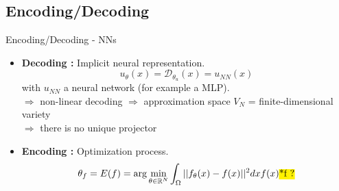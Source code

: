 \subsection{Encoding/Decoding}

\begin{frame}{Encoding/Decoding - NNs}
	\begin{itemize}[\textbullet]
		\item \textbf{Decoding :} Implicit neural representation.
		\begin{equation*}
			u_\theta(x)=\mathcal{D}_{\theta_u}(x)=u_{NN}(x)
		\end{equation*}
		with $u_{NN}$ a neural network (for example a MLP). \\
		$\Rightarrow$ non-linear decoding $\Rightarrow$ approximation space $V_N$ = finite-dimensional variety \\
		$\Rightarrow$ there is no unique projector
		\item \textbf{Encoding :} Optimization process.
		\begin{equation*}
			\theta_f=E(f)=\arg\min_{\theta\in\mathbb{R}^N}\int_\Omega ||f_\theta(x)-f(x)||^2 dx f(x) \text{\hl{*f ?}}
		\end{equation*}
	\end{itemize}
\end{frame}

